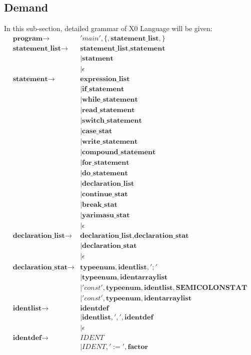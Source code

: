 \documentclass{article}
\begin{document}
		\subsection{Demand}
		In this sub-section, detailed grammar of X0 Language will be given:
		\begin{align}
		\textbf{program} \rightarrow & 'main', \lbrace, \textbf{statement\_list}, \rbrace \\
		\textbf{statement\_list} \rightarrow &
		\textbf{statement\_list}, \textbf{statement} \\ 
	  &| \textbf{statment} \\ 
	  &| \epsilon \\
		\textbf{statement} \rightarrow &
		\textbf{expression\_list} \\ 
	  &| \textbf{if\_statement} \\ 
	  &| \textbf{while\_statement} \\
	  &| \textbf{read\_statement} \\ 
	  &| \textbf{switch\_statement} \\ 
	  &| \textbf{case\_stat} \\ 
	  &| \textbf{write\_statement} \\
	  &| \textbf{compound\_statement} \\ 
	  &| \textbf{for\_statement} \\
	  &| \textbf{do\_statement} \\ 
	  &| \textbf{declaration\_list} \\
	  &| \textbf{continue\_stat} \\ 
	  &| \textbf{break\_stat} \\
	  &| \textbf{yarimasu\_stat}\\
	  &| \epsilon \\
		\textbf{declaration\_list} \rightarrow &
		\textbf{declaration\_list}, \textbf{declaration\_stat}\\ 
	  &| \textbf{declaration\_stat} \\ 
	  &| \epsilon \\
	  	\textbf{declaration\_stat} \rightarrow & 
	  	\textbf{typeenum},\textbf{identlist},';'\\
	  &|\textbf{typeenum},\textbf{identarraylist}\\
	  &|'const',\textbf{typeenum},\textbf{identlist},\textbf{SEMICOLONSTAT}\\
	  &|'const',\textbf{typeenum},\textbf{identarraylist}\\
	  \textbf{identlist} \rightarrow & 
	  \textbf{identdef} \\
	  &|\textbf{identlist}, ',', \textbf{identdef} \\
	  &|\epsilon \\
	  \textbf{identdef} \rightarrow &
	  IDENT \\
	  &|IDENT, ':=', \textbf{factor} \\
	  \end{align}
\end{document}

